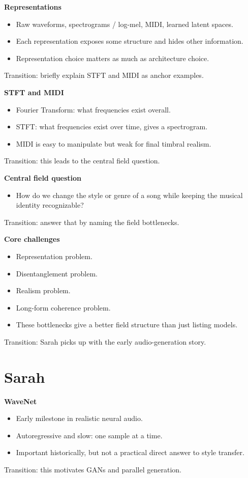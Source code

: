 \documentclass[11pt]{article}
\begin{document}
\textbf{Representations}
\begin{itemize}
\item Raw waveforms, spectrograms / log-mel, MIDI, learned latent spaces.
\item Each representation exposes some structure and hides other information.
\item Representation choice matters as much as architecture choice.
\end{itemize}
\textcolor{Muted}{Transition: briefly explain STFT and MIDI as anchor examples.}

\textbf{STFT and MIDI}
\begin{itemize}
\item Fourier Transform: what frequencies exist overall.
\item STFT: what frequencies exist over time, gives a spectrogram.
\item MIDI is easy to manipulate but weak for final timbral realism.
\end{itemize}
\textcolor{Muted}{Transition: this leads to the central field question.}

\textbf{Central field question}
\begin{itemize}
\item How do we change the style or genre of a song while keeping the musical identity recognizable?
\end{itemize}
\textcolor{Muted}{Transition: answer that by naming the field bottlenecks.}

\textbf{Core challenges}
\begin{itemize}
\item Representation problem.
\item Disentanglement problem.
\item Realism problem.
\item Long-form coherence problem.
\item These bottlenecks give a better field structure than just listing models.
\end{itemize}
\textcolor{Muted}{Transition: Sarah picks up with the early audio-generation story.}

\section*{Sarah}

\textbf{WaveNet}
\begin{itemize}
\item Early milestone in realistic neural audio.
\item Autoregressive and slow: one sample at a time.
\item Important historically, but not a practical direct answer to style transfer.
\end{itemize}
\textcolor{Muted}{Transition: this motivates GANs and parallel generation.}
\end{document}
